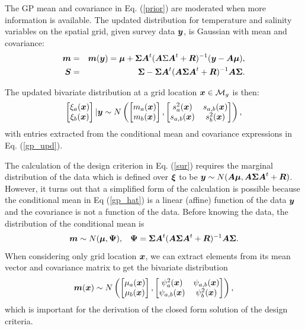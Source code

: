 \documentclass[aoas]{imsart}
\newcommand{\kcomment}[1]{{\color{red}{\{KR: #1\}}}}
\newcommand{\kc}{\kcomment}
\begin{document}
The GP mean and covariance in Eq. (\ref{prior}) are moderated \kc{What
  does 'moderated' mean?} when more information is available. The
updated distribution for temperature and salinity variables on the
spatial grid, given survey data ${\boldsymbol y}$, is Gaussian with mean and
covariance: 
\begin{eqnarray}\label{gp_upd}
  \bm &=& \bm(\by) = \bmu+\bSigma \bA^t (\bA \Sigma \bA^t+\bR)^{-1}(\by-\bA \bmu),  \\
  \bS &=& \bSigma - \bSigma \bA^t (\bA \bSigma \bA^t+\bR)^{-1} \bA
          \bSigma.\nonumber
\end{eqnarray}

The updated bivariate distribution at a grid location ${\boldsymbol x} \in
\mathcal{M}_g$ is then: 
\begin{equation}\label{gp_hat}
\begin{bmatrix}
\xi_a(\bx) \\
\xi_b(\bx)
\end{bmatrix}
 |\by
 \sim N \left( 
\begin{bmatrix} m_{a}(\bx)\\
m_{b}(\bx)
\end{bmatrix},\begin{bmatrix}
s_{a}^2(\bx) & s_{a,b}(\bx)  \\
s_{a,b}(\bx)  & s_{b}^2(\bx)  
\end{bmatrix}
\right),
\end{equation}
with entries extracted from the conditional mean and covariance
expressions in Eq. (\ref{gp_upd}).

The calculation of the design criterion in Eq. (\ref{sur}) requires
the marginal distribution of the data which is defined over ${\boldsymbol \xi}$ to
be ${\boldsymbol y} \sim N( {\boldsymbol A} {\boldsymbol \mu},{\boldsymbol A} {\boldsymbol \Sigma} {\boldsymbol A}^t+{\boldsymbol R})$.  However, it turns
out that a simplified form of the calculation is possible because the
conditional mean in Eq (\ref{gp_hat}) is a linear (affine) function of
the data ${\boldsymbol y}$ and the covariance is not a function of the data.
Before knowing the data, the distribution of the conditional mean is
\begin{equation}\label{distxi} \bm \sim N(\bmu , \bPsi), \hspace{3mm}
  \bPsi=\bSigma \bA^t (\bA \bSigma \bA^t+\bR)^{-1} \bA \bSigma.
\end{equation} 
When considering only grid location ${\boldsymbol x}$, we can
extract elements from its mean vector and covariance matrix to get the
bivariate distribution \begin{equation}\label{dist_mxi} 
  \bm(\bx) \sim N \left( \begin{bmatrix}
      \mu_{a}(\bx) \\
      \mu_{b}(\bx) \end{bmatrix}, \begin{bmatrix}
      \psi^2_{a}(\bx) & \psi_{a,b}(\bx)\\
      \psi_{a,b}(\bx) & \psi^2_{b}(\bx) \end{bmatrix} \right),
\end{equation}
which is important for the derivation of the closed form solution of the design criteria.
\end{document}
